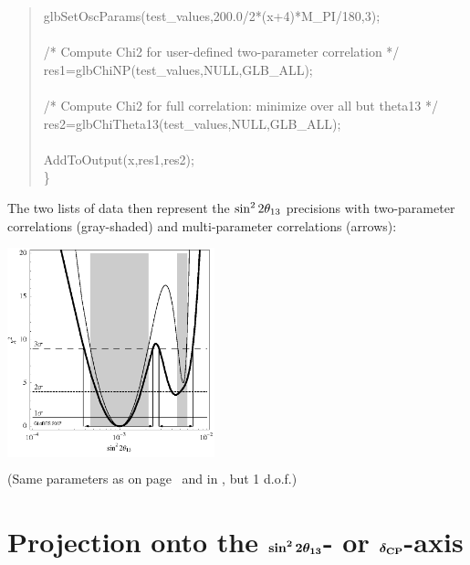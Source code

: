{\begin{quote}
{{\hspace*{0.5cm} glbSetOscParams(test\_values,200.0/2*(x+4)*M\_PI/180,3); \\
 \\
\hspace*{0.5cm} /* Compute Chi2 for user-defined two-parameter correlation */ \\
\hspace*{0.5cm} res1=glbChiNP(test\_values,NULL,GLB\_ALL); \\
      \\
\hspace*{0.5cm} /* Compute Chi2 for full correlation: minimize over all but theta13 */ \\
\hspace*{0.5cm} res2=glbChiTheta13(test\_values,NULL,GLB\_ALL); \\
  \\
\hspace*{0.5cm} AddToOutput(x,res1,res2);\\
  \} 

}}
\end{quote}
The two lists of data then represent the $\stheta$ precisions with two-parameter correlations (gray-shaded) and multi-parameter correlations (arrows):
\begin{center}
\colorbox{white}{\includegraphics[width=6cm]{projallex}}

\vspace*{0.1cm}

\footnotesize{(Same parameters as on page~\pageref{ex:corrth13dcp} and in , but 1 d.o.f.)}
\end{center}
}
\section[Projection onto the $\stheta$-axis or $\deltacp$-axis]{Projection onto the $\boldsymbol{\sin^2 2 \theta_{13}}$- or $\boldsymbol{\delta_{\mathrm{CP}}}$-axis}

